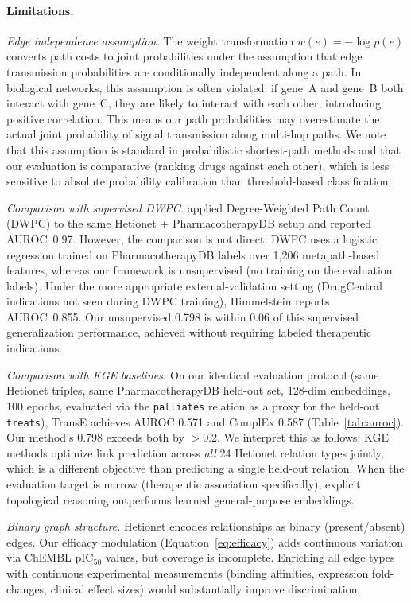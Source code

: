 \documentclass[11pt,a4paper]{article}
\begin{document}
\paragraph{Limitations.}

\textit{Edge independence assumption.}
The weight transformation $w(e) = -\log p(e)$ converts path costs to
joint probabilities under the assumption that edge transmission
probabilities are conditionally independent along a path. In biological
networks, this assumption is often violated: if gene~A and gene~B both
interact with gene~C, they are likely to interact with each other,
introducing positive correlation. This means our path probabilities may
overestimate the actual joint probability of signal transmission along
multi-hop paths. We note that this assumption is standard in
probabilistic shortest-path methods and that our evaluation is
comparative (ranking drugs against each other), which is less sensitive
to absolute probability calibration than threshold-based classification.

\textit{Comparison with supervised DWPC.}
\citet{himmelstein2017systematic} applied Degree-Weighted Path Count
(DWPC) to the same Hetionet + PharmacotherapyDB setup and reported
AUROC~0.97. However, the comparison is not direct: DWPC uses a logistic
regression trained on PharmacotherapyDB labels over 1{,}206 metapath-based
features, whereas our framework is unsupervised (no training on the
evaluation labels). Under the more appropriate external-validation
setting (DrugCentral indications not seen during DWPC training),
Himmelstein reports AUROC~0.855. Our unsupervised 0.798 is within
0.06 of this supervised generalization performance, achieved without
requiring labeled therapeutic indications.

\textit{Comparison with KGE baselines.}
On our identical evaluation protocol (same Hetionet triples, same
PharmacotherapyDB held-out set, 128-dim embeddings, 100 epochs,
evaluated via the \texttt{palliates} relation as a proxy for the
held-out \texttt{treats}), TransE achieves AUROC 0.571 and ComplEx
0.587 (Table~\ref{tab:auroc}). Our method's 0.798 exceeds both by
$>$0.2. We interpret this as follows: KGE methods optimize link
prediction across \emph{all} 24 Hetionet relation types jointly,
which is a different objective than predicting a single held-out
relation. When the evaluation target is narrow (therapeutic
association specifically), explicit topological reasoning outperforms
learned general-purpose embeddings.

\textit{Binary graph structure.}
Hetionet encodes relationships as binary (present/absent) edges. Our
efficacy modulation (Equation~\ref{eq:efficacy}) adds continuous
variation via ChEMBL pIC$_{50}$ values, but coverage is incomplete.
Enriching all edge types with continuous experimental measurements
(binding affinities, expression fold-changes, clinical effect sizes)
would substantially improve discrimination.
\end{document}
